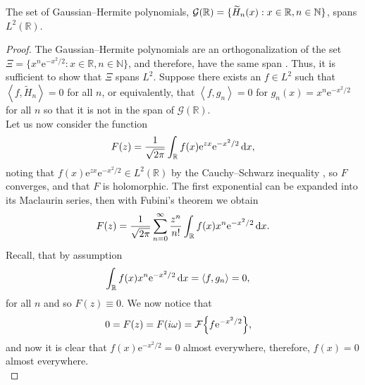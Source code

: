 \begin{theorem}
\label{thm:hermite}
The set of Gaussian--Hermite polynomials, $\mathcal{G}(\mathbb{R}) = \{ \Her{n}{x} : x \in \mathbb{R}, n \in \mathbb{N} \}$, spans $L^2(\mathbb{R})$.
\end{theorem}
\begin{proof}
The Gaussian--Hermite polynomials are an orthogonalization of the set $\Xi = \{x^n \textrm{e}^{-x^2/2} : x \in \mathbb{R}, n \in \mathbb{N}\}$, and therefore, have the same span \cite{kreyszig, szego}. Thus, it is sufficient to show that $\Xi$ spans $L^2$.
Suppose there exists an $f \in L^2$ such that $\left< f, \widetilde{H}_n \right> = 0$ for all $n$, or equivalently, that $\left< f, g_n \right> = 0$ for $g_n(x) = x^n \textrm{e}^{-x^2/2}$ for all $n$ so that it is not in the span of $\mathcal{G}(\mathbb{R})$. \\

Let us now consider the function \cite{courant, szego, teuwen}
\begin{align*}
F(z) = \frac{1}{\sqrt{2\pi}}\int_\mathbb{R} f(x) \textrm{e}^{zx} \textrm{e}^{-x^2/2} \, \textrm{d} x,
\end{align*}
noting that $f(x) \textrm{e}^{zx} \textrm{e}^{-x^2/2} \in L^2(\mathbb{R})$ by the Cauchy--Schwarz inequality \cite{griffel, kolmogorov}, so $F$ converges, and that $F$ is holomorphic. The first exponential can be expanded into its Maclaurin series, then with Fubini's theorem we obtain
\begin{align*}
F(z) = \frac{1}{\sqrt{2\pi}} \sum_{n = 0}^{\infty} \frac{z^n}{n!} \int_\mathbb{R} f(x) x^n \textrm{e}^{-x^2/2} \, \textrm{d} x.
\end{align*}
Recall, that by assumption
\begin{align*}
\int_\mathbb{R} f(x) x^n \textrm{e}^{-x^2/2} \, \df x &= \left< f, g_n \right> = 0,
\end{align*}
for all $n$ and so $F(z) \equiv 0$. We now notice that
\begin{align*}
0 &= F(z) = F(i \omega) = \FT{f \textrm{e}^{-x^2/2}},
\end{align*}
and now it is clear that $f(x) \textrm{e}^{-x^2/2} = 0$ almost everywhere, therefore, $f(x) = 0$ almost everywhere. \\
\end{proof}

